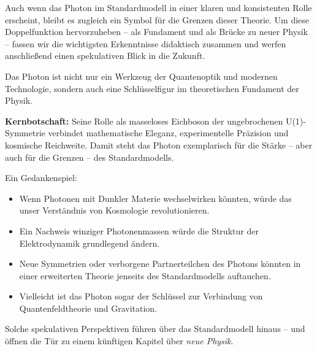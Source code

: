 Auch wenn das Photon im Standardmodell in einer klaren und konsistenten Rolle erscheint, 
bleibt es zugleich ein Symbol für die Grenzen dieser Theorie.  
Um diese Doppelfunktion hervorzuheben – als Fundament und als Brücke zu neuer Physik – 
fassen wir die wichtigsten Erkenntnisse didaktisch zusammen und werfen anschließend 
einen spekulativen Blick in die Zukunft.
\vspace{1em}
\begin{tcolorbox}[didaktikbox, title=Didaktischer Abschluss: Das Photon im Standardmodell]
	\label{box:didaktik_kapVIII}
	Das Photon ist nicht nur ein Werkzeug der Quantenoptik und modernen Technologie, 
	sondern auch eine Schlüsselfigur im theoretischen Fundament der Physik.  
	
	\medskip
	\textbf{Kernbotschaft:}  
	Seine Rolle als masseloses Eichboson der ungebrochenen U(1)-Symmetrie verbindet mathematische Eleganz, 
	experimentelle Präzision und kosmische Reichweite.  
	Damit steht das Photon exemplarisch für die Stärke – aber auch für die Grenzen – des Standardmodells.
\end{tcolorbox}
\vspace{1em}
\begin{tcolorbox}[hypobox, title={Was wäre, wenn das Standardmodell nur ein Zwischenschritt wäre?}]
	\label{Merksatz zum Photon}
	Ein Gedankenspiel:
	\begin{itemize}
		\item Wenn Photonen mit Dunkler Materie wechselwirken könnten, würde das unser Verständnis von Kosmologie revolutionieren.  
		\item Ein Nachweis winziger Photonenmassen würde die Struktur der Elektrodynamik grundlegend ändern.  
		\item Neue Symmetrien oder verborgene Partnerteilchen des Photons könnten in einer erweiterten Theorie jenseits des Standardmodells auftauchen.  
		\item Vielleicht ist das Photon sogar der Schlüssel zur Verbindung von Quantenfeldtheorie und Gravitation.  
	\end{itemize}
	
	\medskip
	Solche spekulativen Perspektiven führen über das Standardmodell hinaus – und öffnen die Tür 
	zu einem künftigen Kapitel über \emph{neue Physik}.
\end{tcolorbox}
